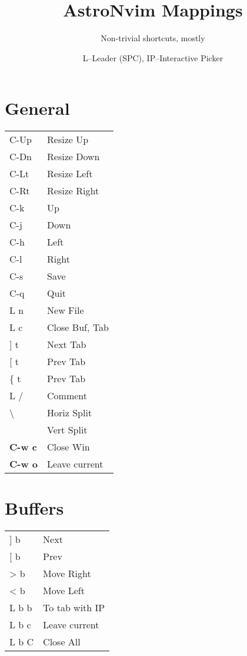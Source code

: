 \documentclass[
  ,landscape
  ,columns=4
]{cheatsheet}
\title{AstroNvim Mappings}
\author{Non-trivial shortcuts, mostly}
\date{L--Leader (SPC), IP--Interactive Picker}
\begin{document}
\maketitle

\section{General}

\begin{tabular}{l>{\color{black}}l}
	C-Up           & Resize Up      \\
	C-Dn           & Resize Down    \\
	C-Lt           & Resize Left    \\
	C-Rt           & Resize Right   \\
	C-k            & Up             \\
	C-j            & Down           \\
	C-h            & Left           \\
	C-l            & Right          \\
	C-s            & Save           \\
	C-q            & Quit           \\
	L n            & New File       \\
	L c            & Close Buf, Tab \\
	{]} t          & Next Tab       \\
	{[} t          & Prev Tab       \\
	\{ t           & Prev Tab       \\
	L /            & Comment        \\
	\textbackslash & Horiz Split    \\
	\textbar       & Vert Split     \\
	\textbf{C-w c} & Close Win      \\
	\textbf{C-w o} & Leave current  \\
\end{tabular}

\section{Buffers}

\begin{tabular}{ll}
	{]} b & Next           \\
	{[} b & Prev           \\
	> b   & Move Right     \\
	< b   & Move Left      \\
	L b b & To tab with IP \\
	L b c & Leave current  \\
	L b C & Close All      \\
\end{tabular}
\end{document}
